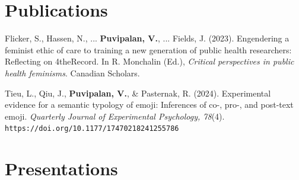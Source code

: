 \documentclass[12pt, letterpaper]{article}
\begin{document}
\section{Publications}
\doublespacing
\begin{cvlist}

\item Flicker, S., Hassen, N., ... \textbf{Puvipalan, V.}, ... Fields, J. (2023). Engendering a feminist ethic of care to training a new generation of public health researchers: Reflecting on 4theRecord. In R. Monchalin (Ed.), \textit{Critical perspectives in public health feminisms}. Canadian Scholars.

\item Tieu, L., Qiu, J., \textbf{Puvipalan, V.}, \& Pasternak, R. (2024). Experimental evidence for a semantic typology of emoji: Inferences of co-, pro-, and post-text emoji. \textit{Quarterly Journal of Experimental Psychology, 78}(4). \texttt{https://doi.org/10.1177/17470218241255786}

\end{cvlist}

\section{Presentations}
\end{document}
